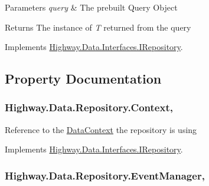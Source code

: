 \begin{DoxyParams}{Parameters}
{\em query} & The prebuilt Query Object\\
\hline
\end{DoxyParams}
\begin{DoxyReturn}{Returns}
The instance of {\itshape T}  returned from the query
\end{DoxyReturn}


Implements \hyperlink{interface_highway_1_1_data_1_1_interfaces_1_1_i_repository_ab64290450d370e1c29e31ea92d3ff18d}{Highway.\-Data.\-Interfaces.\-I\-Repository}.



\subsection{Property Documentation}
\hypertarget{class_highway_1_1_data_1_1_repository_a56e71ca922bdbd73db6986b3609e5ed7}{
\subsubsection[{Context}]{ Highway.\-Data.\-Repository.\-Context\hspace{0.3cm}{\ttfamily [get]}, {\ttfamily [set]}}}\label{class_highway_1_1_data_1_1_repository_a56e71ca922bdbd73db6986b3609e5ed7}


Reference to the \hyperlink{class_highway_1_1_data_1_1_data_context}{Data\-Context} the repository is using 



Implements \hyperlink{interface_highway_1_1_data_1_1_interfaces_1_1_i_repository_aadf2e3d1d5b118f2fe6e2b1fc1ae8e77}{Highway.\-Data.\-Interfaces.\-I\-Repository}.

\hypertarget{class_highway_1_1_data_1_1_repository_ac1ac32fc8d217cfb1d47bb1cc68088c6}{
\subsubsection[{Event\-Manager}]{ Highway.\-Data.\-Repository.\-Event\-Manager\hspace{0.3cm}{\ttfamily [get]}, {\ttfamily [set]}}}\label{class_highway_1_1_data_1_1_repository_ac1ac32fc8d217cfb1d47bb1cc68088c6}


